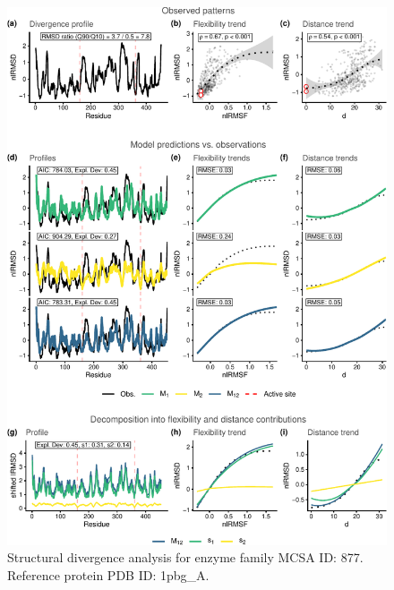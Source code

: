 \documentclass[
]{article}
\begin{document}
\clearpage
\begin{figure}[H]
\centering


\begin{center}\includegraphics{supplementary_material_files/figure-latex/generate_figures-31} \end{center}

\caption{Structural divergence analysis for enzyme family MCSA ID: 877. Reference protein PDB ID: 1pbg\_A.}
\end{figure}
\end{document}
